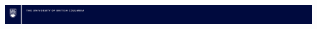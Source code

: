 \documentclass[final]{beamer}
\begin{document}
\begin{frame}[fragile]
\vspace{2mm}
\hspace{-2cm}
\includegraphics[width=1.05\paperwidth]{ubc_research_poster_bar_desktop_publishing_package/ubc_posterbar_Blue.png}


\end{frame}
\end{document}

